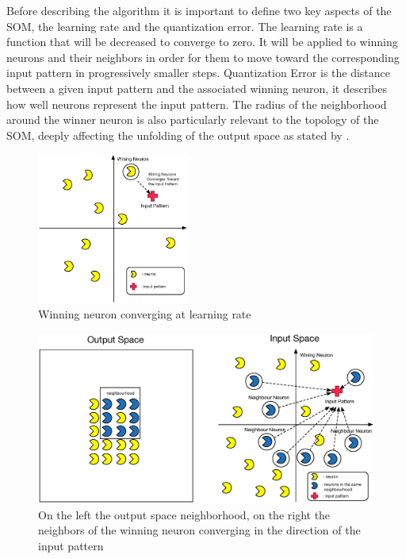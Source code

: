 Before describing the algorithm it is important to define two key aspects of the SOM, the learning rate and the quantization error. The learning rate is a function that will be decreased to converge to zero. It will be applied to winning neurons and their neighbors in order for them to move toward the corresponding input pattern in progressively smaller steps. Quantization Error is the distance between a given input pattern and the associated winning neuron, it describes how well neurons represent the input pattern. The radius of the neighborhood around the winner neuron is also particularly relevant to the topology of the SOM, deeply affecting the unfolding of the output space as stated by \citep{Bacao2005}.
\par





\begin{figure}
  \begin{center}
    \includegraphics[width=5cm]{images/4_wining_neuron_converge.eps}
  \end{center}
  \caption{ Winning neuron converging at learning rate }
  \label{fig:4_wining_neuron_converge}
\end{figure}

\begin{figure}
  \begin{center}
    \includegraphics[width=12cm]{images/5_neighbours_converge.eps}
  \end{center}
  \caption{ On the left the output space neighborhood, on the right the neighbors of the winning neuron converging in the direction of the input pattern }
  \label{fig:5_neighbours_converge}
\end{figure}

